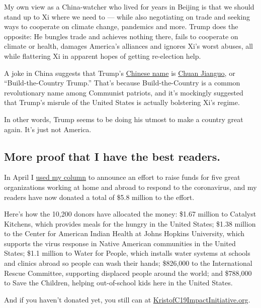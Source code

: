 My own view as a China-watcher who lived for years in Beijing is that we
should stand up to Xi where we need to --- while also negotiating on
trade and seeking ways to cooperate on climate change, pandemics and
more. Trump does the opposite: He bungles trade and achieves nothing
there, fails to cooperate on climate or health, damages America's
alliances and ignores Xi's worst abuses, all while flattering Xi in
apparent hopes of getting re-election help.

A joke in China suggests that Trump's
\href{https://www.whatsonweibo.com/trump-two-different-names-chinese/}{Chinese
name} is
\href{https://www.quora.com/Why-do-so-many-Chinese-people-call-Donald-Trump-Chuan-Jianguo-\%E5\%B7\%9D\%E5\%BB\%BA\%E5\%9B\%BD}{Chuan
Jianguo}, or ``Build-the-Country Trump.'' That's because
Build-the-Country is a common revolutionary name among Communist
patriots, and it's mockingly suggested that Trump's misrule of the
United States is actually bolstering Xi's regime.

In other words, Trump seems to be doing his utmost to make a country
great again. It's just not America.

\hypertarget{more-proof-that-i-have-the-best-readers}{%
\subsection{More proof that I have the best
readers.}\label{more-proof-that-i-have-the-best-readers}}

In April I
\href{https://www.nytimes3xbfgragh.onion/2020/04/25/opinion/sunday/coronavirus-giving-guide.html}{used
my column} to announce an effort to raise funds for five great
organizations working at home and abroad to respond to the coronavirus,
and my readers have now donated a total of \$5.8 million to the effort.

Here's how the 10,200 donors have allocated the money: \$1.67 million to
Catalyst Kitchens, which provides meals for the hungry in the United
States; \$1.38 million to the Center for American Indian Health at Johns
Hopkins University, which supports the virus response in Native American
communities in the United States; \$1.1 million to Water for People,
which installs water systems at schools and clinics abroad so people can
wash their hands; \$826,000 to the International Rescue Committee,
supporting displaced people around the world; and \$788,000 to Save the
Children, helping out-of-school kids here in the United States.

And if you haven't donated yet, you still can at
\href{https://kristofc19impactinitiative.org/}{KristofC19ImpactInitiative.org}.


